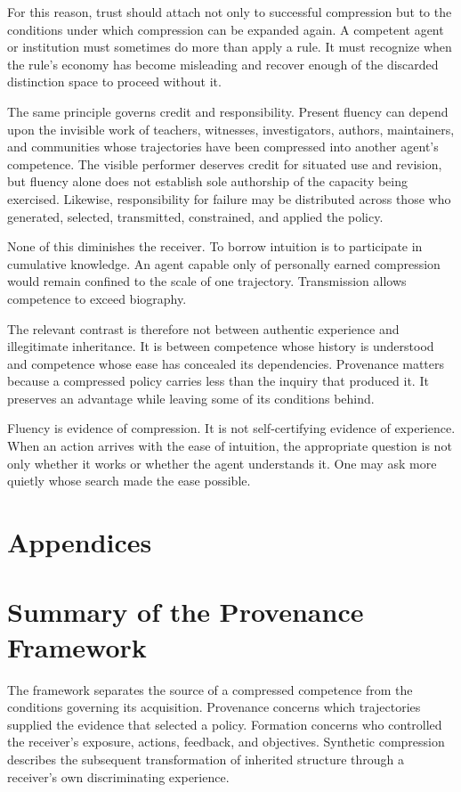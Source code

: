 \documentclass[11pt]{article}
\begin{document}
For this reason, trust should attach not only to successful compression but to the conditions under which compression can be expanded again. A competent agent or institution must sometimes do more than apply a rule. It must recognize when the rule's economy has become misleading and recover enough of the discarded distinction space to proceed without it.

The same principle governs credit and responsibility. Present fluency can depend upon the invisible work of teachers, witnesses, investigators, authors, maintainers, and communities whose trajectories have been compressed into another agent's competence. The visible performer deserves credit for situated use and revision, but fluency alone does not establish sole authorship of the capacity being exercised. Likewise, responsibility for failure may be distributed across those who generated, selected, transmitted, constrained, and applied the policy.

None of this diminishes the receiver. To borrow intuition is to participate in cumulative knowledge. An agent capable only of personally earned compression would remain confined to the scale of one trajectory. Transmission allows competence to exceed biography.

The relevant contrast is therefore not between authentic experience and illegitimate inheritance. It is between competence whose history is understood and competence whose ease has concealed its dependencies. Provenance matters because a compressed policy carries less than the inquiry that produced it. It preserves an advantage while leaving some of its conditions behind.

Fluency is evidence of compression. It is not self-certifying evidence of experience. When an action arrives with the ease of intuition, the appropriate question is not only whether it works or whether the agent understands it. One may ask more quietly whose search made the ease possible.


\newpage 
\section*{Appendices}

\appendix

\section{Summary of the Provenance Framework}

The framework separates the source of a compressed competence from the conditions governing its acquisition. Provenance concerns which trajectories supplied the evidence that selected a policy. Formation concerns who controlled the receiver's exposure, actions, feedback, and objectives. Synthetic compression describes the subsequent transformation of inherited structure through a receiver's own discriminating experience.
\end{document}
